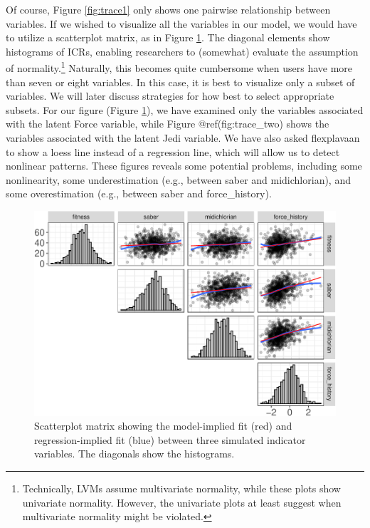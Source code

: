 \documentclass[
  english,
  doc]{apa6}
\begin{document}
Of course, Figure \ref{fig:trace1} only shows one pairwise relationship between variables. If we wished to visualize all the variables in our model, we would have to utilize a scatterplot matrix, as in Figure \ref{fig:traceMatrix}. The diagonal elements show histograms of ICRs, enabling researchers to (somewhat) evaluate the assumption of normality.\footnote{Technically, LVMs assume multivariate normality, while these plots show univariate normality. However, the univariate plots at least suggest when multivariate normality might be violated.} Naturally, this becomes quite cumbersome when users have more than seven or eight variables. In this case, it is best to visualize only a subset of variables. We will later discuss strategies for how best to select appropriate subsets. For our figure (Figure \ref{fig:traceMatrix}), we have examined only the variables associated with the latent Force variable, while Figure @ref(fig:trace\_two) shows the variables associated with the latent Jedi variable. We have also asked flexplavaan to show a loess line instead of a regression line, which will allow us to detect nonlinear patterns. These figures reveals some potential problems, including some nonlinearity, some underestimation (e.g., between saber and midichlorian), and some overestimation (e.g., between saber and force\_history).

\begin{figure}
\centering
\includegraphics{flexplavaan_draft_files/figure-latex/traceMatrix-1.pdf}
\caption{\label{fig:traceMatrix}Scatterplot matrix showing the model-implied fit (red) and regression-implied fit (blue) between three simulated indicator variables. The diagonals show the histograms.}
\end{figure}
\end{document}
